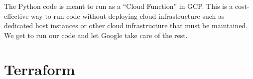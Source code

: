 \justifying
The Python code is meant to run as a ``Cloud Function'' in GCP. This is a cost-effective way to run code
without deploying cloud infrastructure such as dedicated host instances or other cloud infrastructure
that must be maintained. We get to run our code and let Google take care of the rest.

\section{\label{sec:Terraform}Terraform}


\clearpage
\begin{versionhistory}
\end{versionhistory}

\clearpage




